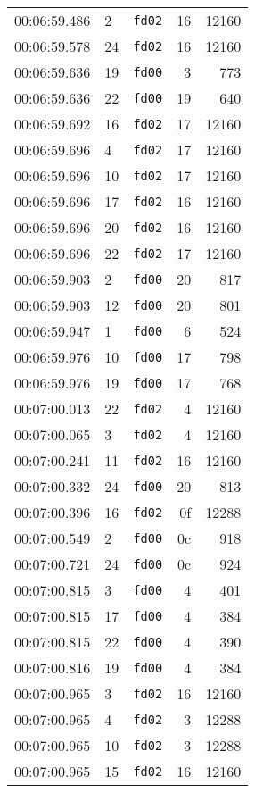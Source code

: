 \documentclass{article}
\begin{document}
\begin{longtable}{lllrr}
00:06:59.486 & 2 & \texttt{fd02} & 16 & 12160 \\
00:06:59.578 & 24 & \texttt{fd02} & 16 & 12160 \\
00:06:59.636 & 19 & \texttt{fd00} & 3 & 773 \\
00:06:59.636 & 22 & \texttt{fd00} & 19 & 640 \\
00:06:59.692 & 16 & \texttt{fd02} & 17 & 12160 \\
00:06:59.696 & 4 & \texttt{fd02} & 17 & 12160 \\
00:06:59.696 & 10 & \texttt{fd02} & 17 & 12160 \\
00:06:59.696 & 17 & \texttt{fd02} & 16 & 12160 \\
00:06:59.696 & 20 & \texttt{fd02} & 16 & 12160 \\
00:06:59.696 & 22 & \texttt{fd02} & 17 & 12160 \\
00:06:59.903 & 2 & \texttt{fd00} & 20 & 817 \\
00:06:59.903 & 12 & \texttt{fd00} & 20 & 801 \\
00:06:59.947 & 1 & \texttt{fd00} & 6 & 524 \\
00:06:59.976 & 10 & \texttt{fd00} & 17 & 798 \\
00:06:59.976 & 19 & \texttt{fd00} & 17 & 768 \\
00:07:00.013 & 22 & \texttt{fd02} & 4 & 12160 \\
00:07:00.065 & 3 & \texttt{fd02} & 4 & 12160 \\
00:07:00.241 & 11 & \texttt{fd02} & 16 & 12160 \\
00:07:00.332 & 24 & \texttt{fd00} & 20 & 813 \\
00:07:00.396 & 16 & \texttt{fd02} & 0f & 12288 \\
00:07:00.549 & 2 & \texttt{fd00} & 0c & 918 \\
00:07:00.721 & 24 & \texttt{fd00} & 0c & 924 \\
00:07:00.815 & 3 & \texttt{fd00} & 4 & 401 \\
00:07:00.815 & 17 & \texttt{fd00} & 4 & 384 \\
00:07:00.815 & 22 & \texttt{fd00} & 4 & 390 \\
00:07:00.816 & 19 & \texttt{fd00} & 4 & 384 \\
00:07:00.965 & 3 & \texttt{fd02} & 16 & 12160 \\
00:07:00.965 & 4 & \texttt{fd02} & 3 & 12288 \\
00:07:00.965 & 10 & \texttt{fd02} & 3 & 12288 \\
00:07:00.965 & 15 & \texttt{fd02} & 16 & 12160 \\

\end{longtable}
\end{document}
